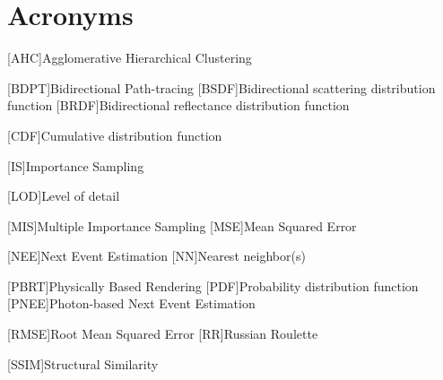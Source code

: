 \newpage
\section*{Acronyms}

\begin{acronym}[ECU]


[AHC]{Agglomerative Hierarchical Clustering}

[BDPT]{Bidirectional Path-tracing}
[BSDF]{Bidirectional scattering distribution function}
[BRDF]{Bidirectional reflectance distribution function}


[CDF]{Cumulative distribution function}

[IS]{Importance Sampling}

[LOD]{Level of detail}

[MIS]{Multiple Importance Sampling}
[MSE]{Mean Squared Error}

[NEE]{Next Event Estimation}
[NN]{Nearest neighbor(s)}

[PBRT]{Physically Based Rendering}
[PDF]{Probability distribution function}
[PNEE]{Photon-based Next Event Estimation}

[RMSE]{Root Mean Squared Error}
[RR]{Russian Roulette}

[SSIM]{Structural Similarity}

\end{acronym}
